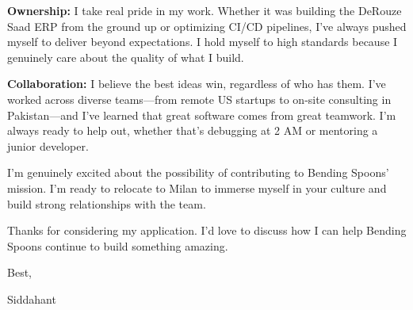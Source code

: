 \documentclass[letterpaper,10pt]{article}
\begin{document}
\textbf{Ownership:} I take real pride in my work. Whether it was building the DeRouze Saad ERP from the ground up or optimizing CI/CD pipelines, I've always pushed myself to deliver beyond expectations. I hold myself to high standards because I genuinely care about the quality of what I build.

\textbf{Collaboration:} I believe the best ideas win, regardless of who has them. I've worked across diverse teams—from remote US startups to on-site consulting in Pakistan—and I've learned that great software comes from great teamwork. I'm always ready to help out, whether that's debugging at 2 AM or mentoring a junior developer.

I'm genuinely excited about the possibility of contributing to Bending Spoons' mission. I'm ready to relocate to Milan to immerse myself in your culture and build strong relationships with the team.

Thanks for considering my application. I'd love to discuss how I can help Bending Spoons continue to build something amazing.

Best,

Siddahant
\end{document}
